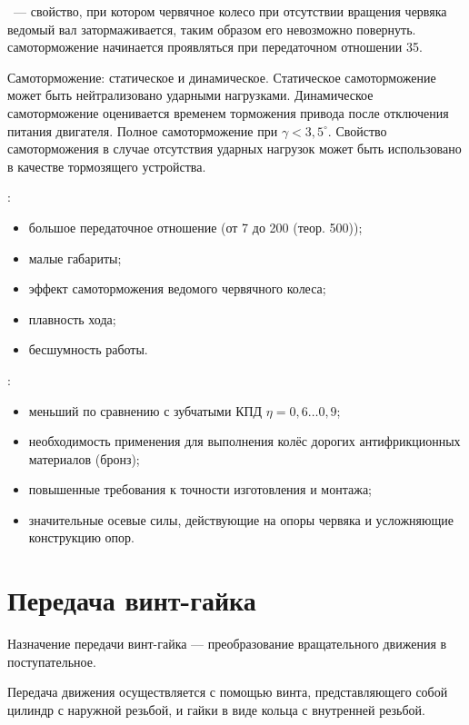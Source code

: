 \documentclass{tufte-book}
\begin{document}
~--- свойство, при котором червячное колесо при отсутствии вращения червяка ведомый вал затормаживается, таким образом его невозможно повернуть. самоторможение начинается проявляться при передаточном отношении 35. 

Самоторможение: статическое и динамическое. Статическое самоторможение может быть нейтрализовано ударными нагрузками. Динамическое самоторможение оценивается временем торможения привода после отключения питания двигателя. Полное самоторможение при $ \gamma < 3,5^\circ $. Свойство самоторможения в случае отсутствия ударных нагрузок может быть использовано в качестве тормозящего устройства.



:
\begin{itemize}
	\item большое передаточное отношение (от 7 до 200 (теор. 500));
	\item малые габариты;
	\item эффект самоторможения ведомого червячного колеса;
	\item плавность хода;
	\item бесшумность работы.
\end{itemize}

:
\begin{itemize}
	\item меньший по сравнению с зубчатыми КПД $ \eta=0,6\ldots0,9 $;
	\item необходимость применения для выполнения колёс дорогих антифрикционных материалов (бронз);
	\item повышенные требования к точности изготовления и монтажа;
	\item значительные осевые силы, действующие на опоры червяка и усложняющие конструкцию опор.
\end{itemize}

\chapter{Передача винт-гайка}
\label{ch:vint-gaika}

Назначение передачи винт-гайка --- преобразование вращательного движения в поступательное.

Передача движения осуществляется с помощью винта, представляющего собой цилиндр с наружной резьбой, и гайки в виде кольца с внутренней резьбой.
\end{document}
